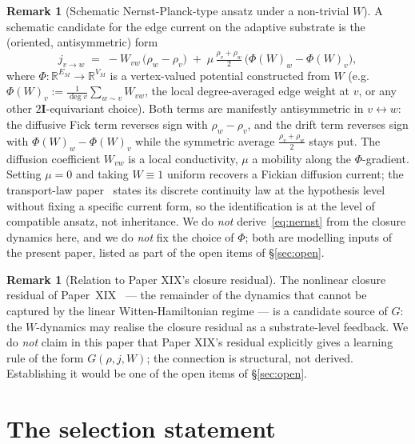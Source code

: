 \documentclass[11pt]{article}
\theoremstyle{definition}
\newtheorem{remark}[theorem]{Remark}
\newcommand{\R}{\mathbb{R}}
\newcommand{\twoI}{2\mathbf{I}}
\begin{document}
\begin{remark}[Schematic Nernst-Planck-type ansatz under a non-trivial $W$]\label{rem:nernst}
A schematic candidate for the edge current on the adaptive substrate is the (oriented, antisymmetric) form
\begin{equation}\label{eq:nernst}
    j_{v \to w} \;=\; -W_{vw}\,\bigl(\rho_w - \rho_v\bigr) \;+\; \mu\,\tfrac{\rho_v + \rho_w}{2}\,\bigl(\Phi(W)_w - \Phi(W)_v\bigr),
\end{equation}
where $\Phi: \R^{E_M} \to \R^{V_M}$ is a vertex-valued potential constructed from $W$ (e.g.\ $\Phi(W)_v := \tfrac{1}{\deg v}\sum_{w \sim v} W_{vw}$, the local degree-averaged edge weight at $v$, or any other $\twoI$-equivariant choice). Both terms are manifestly antisymmetric in $v \leftrightarrow w$: the diffusive Fick term reverses sign with $\rho_w - \rho_v$, and the drift term reverses sign with $\Phi(W)_w - \Phi(W)_v$ while the symmetric average $\tfrac{\rho_v + \rho_w}{2}$ stays put. The diffusion coefficient $W_{vw}$ is a local conductivity, $\mu$ a mobility along the $\Phi$-gradient. Setting $\mu = 0$ and taking $W \equiv 1$ uniform recovers a Fickian diffusion current; the transport-law paper~\citep{SmartTransportLaw} states its discrete continuity law at the hypothesis level without fixing a specific current form, so the identification is at the level of compatible ansatz, not inheritance. We do \emph{not} derive~\eqref{eq:nernst} from the closure dynamics here, and we do \emph{not} fix the choice of $\Phi$; both are modelling inputs of the present paper, listed as part of the open items of \S\ref{sec:open}.
\end{remark}

\begin{remark}[Relation to Paper XIX's closure residual]
The nonlinear closure residual of Paper~XIX~\citep{SmartXIX} --- the remainder of the dynamics that cannot be captured by the linear Witten-Hamiltonian regime --- is a candidate source of $G$: the $W$-dynamics may realise the closure residual as a substrate-level feedback. We do \emph{not} claim in this paper that Paper XIX's residual explicitly gives a learning rule of the form $G(\rho, j, W)$; the connection is structural, not derived. Establishing it would be one of the open items of \S\ref{sec:open}.
\end{remark}

\section{The selection statement}\label{sec:selection}
\end{document}
